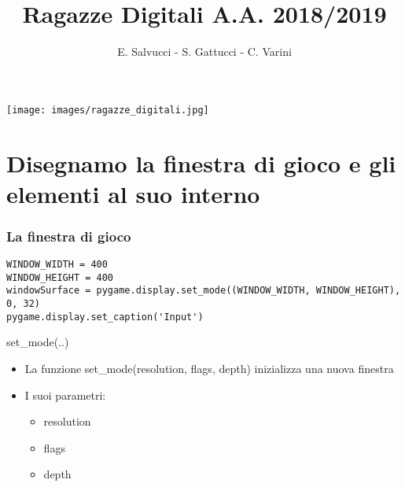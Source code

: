 \documentclass{beamer}
\title[Ragazze Digitali 2019]{Ragazze Digitali A.A. 2018/2019}
\author{E. Salvucci - S. Gattucci - C. Varini}
\date{}
\begin{document}
{\texttt{[image: images/ragazze\_digitali.jpg]}}
\begin{frame}
\end{frame}


\section{Disegnamo la finestra di gioco e gli elementi al suo interno}

\begin{frame}[fragile]
    \frametitle{La finestra di gioco}
    
    \begin{lstlisting}
WINDOW_WIDTH = 400
WINDOW_HEIGHT = 400
windowSurface = pygame.display.set_mode((WINDOW_WIDTH, WINDOW_HEIGHT), 0, 32)
pygame.display.set_caption('Input')
    \end{lstlisting}
    
    \begin{block}{set\_mode(..)}
        \begin{itemize}
            \item La funzione set\_mode(resolution, flags, depth) inizializza una nuova finestra
            \item I suoi parametri:
                \begin{itemize}
                    \item resolution
                    \item flags
                    \item depth
                \end{itemize}
        \end{itemize}
    \end{block}

\end{frame}
\end{document}
